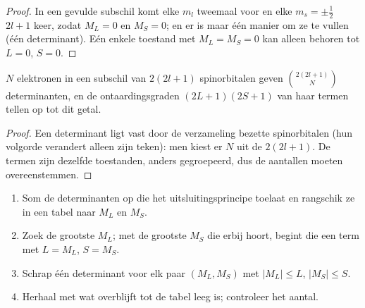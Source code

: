 \begin{proof}
In een gevulde subschil komt elke $m_l$ tweemaal voor en elke $m_s = \pm\frac12$
$2l+1$ keer, zodat $M_L = 0$ en $M_S = 0$; en er is maar één manier om ze
te vullen (één determinant). Eén enkele toestand met $M_L = M_S = 0$ kan alleen
behoren tot $L = 0$, $S = 0$.
\end{proof}

\begin{proposition}\label{prop:b3:many-electron-atoms:count}
$N$ elektronen in een subschil van $2(2l+1)$ spinorbitalen geven
$\binom{2(2l+1)}{N}$ determinanten, en de ontaardingsgraden $(2L+1)(2S+1)$ van
haar termen tellen op tot dit getal.
\end{proposition}

\begin{proof}
Een determinant ligt vast door de verzameling bezette spinorbitalen (hun
volgorde verandert alleen zijn teken): men kiest er $N$ uit de $2(2l+1)$.
De termen zijn dezelfde toestanden, anders gegroepeerd, dus de aantallen
moeten overeenstemmen.
\end{proof}

\begin{method}\label{met:b3:many-electron-atoms:terms}
\begin{enumerate}
  \item Som de determinanten op die het uitsluitingsprincipe toelaat en
        rangschik ze in een tabel naar $M_L$ en $M_S$.
  \item Zoek de grootste $M_L$; met de grootste $M_S$ die erbij hoort,
        begint die een term met $L = M_L$, $S = M_S$.
  \item Schrap één determinant voor elk paar $(M_L, M_S)$ met
        $|M_L| \le L$, $|M_S| \le S$.
  \item Herhaal met wat overblijft tot de tabel leeg is; controleer het aantal.
\end{enumerate}
\end{method}

